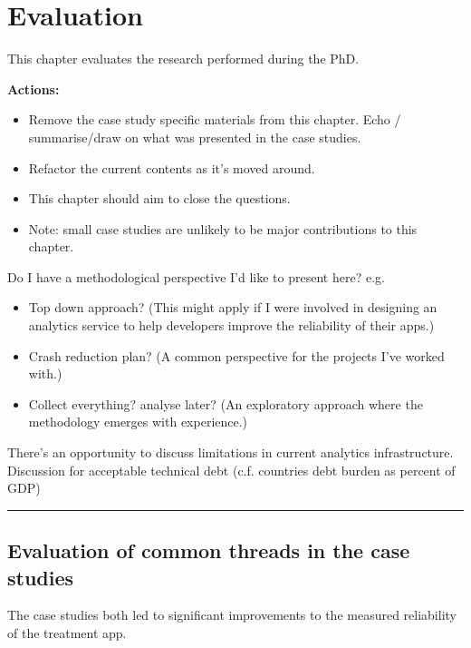\chapter{Evaluation}
\label{chapter-evaluation}

This chapter evaluates the research performed during the PhD.



\textbf{Actions:} 
\begin{itemize}
    \item Remove the case study specific materials from this chapter. Echo / summarise/draw on what was presented in the case studies. 
    \item Refactor the current contents as it's moved around.
    \item This chapter should aim to close the questions. 
    \item Note: small case studies are unlikely to be major contributions to this chapter.
\end{itemize}



Do I have a methodological perspective I'd like to present here?
e.g.
\begin{itemize}
    \item Top down approach? (This might apply if I were involved in designing an analytics service to help developers improve the reliability of their apps.)
    \item Crash reduction plan? (A common perspective for the projects I've worked with.) 
    \item Collect everything? analyse later? (An exploratory approach where the methodology emerges with experience.)
\end{itemize}


There's an opportunity to discuss limitations in current analytics infrastructure. Discussion for acceptable technical debt (c.f. countries debt burden as percent of GDP)


\par\noindent\rule{\textwidth}{0.4pt}

\newpage
\section{Evaluation of common threads in the case studies}
The case studies both led to significant improvements to the measured reliability of the treatment app. 

